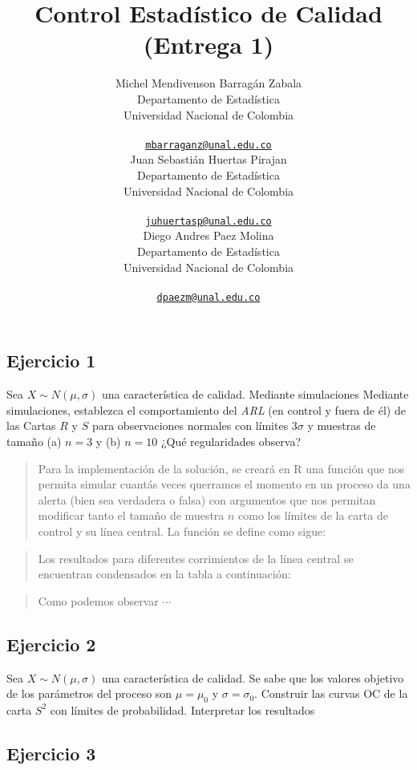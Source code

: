 \documentclass{article}
\title{Control Estadístico de Calidad (Entrega 1)}
\author{
    Michel Mendivenson Barragán Zabala
   \\
    Departamento de Estadística \\
    Universidad Nacional de Colombia \\
   \\
  \texttt{\href{mailto:mbarraganz@unal.edu.co}{\nolinkurl{mbarraganz@unal.edu.co}}} \\
   \And
    Juan Sebastián Huertas Pirajan
   \\
    Departamento de Estadística \\
    Universidad Nacional de Colombia \\
   \\
  \texttt{\href{mailto:juhuertasp@unal.edu.co}{\nolinkurl{juhuertasp@unal.edu.co}}} \\
   \And
    Diego Andres Paez Molina
   \\
    Departamento de Estadística \\
    Universidad Nacional de Colombia \\
   \\
  \texttt{\href{mailto:dpaezm@unal.edu.co}{\nolinkurl{dpaezm@unal.edu.co}}} \\
  }
\renewenvironment{abstract}{}{}
\begin{document}
\maketitle


\begin{abstract}

\end{abstract}


\hypertarget{ejercicio-1}{%
\subsection{Ejercicio 1}\label{ejercicio-1}}

Sea \(X \sim N(\mu, \sigma)\) una característica de calidad. Mediante
simulaciones Mediante simulaciones, establezca el comportamiento del
\emph{ARL} (en control y fuera de él) de las Cartas \(R\) y \(S\) para
observaciones normales con límites \(3\sigma\) y muestras de tamaño (a)
\(n = 3\) y (b) \(n = 10\) ¿Qué regularidades observa?

\begin{quote}
Para la implementación de la solución, se creará en R una función que
nos permita simular cuantás veces querramos el momento en un proceso da
una alerta (bien sea verdadera o falsa) con argumentos que nos permitan
modificar tanto el tamaño de muestra \(n\) como los límites de la carta
de control y su línea central. La función se define como sigue:
\end{quote}

\begin{quote}
Los resultados para diferentes corrimientos de la línea central se
encuentran condensados en la tabla a continuación:
\end{quote}

\begin{quote}
Como podemos observar \(\cdots\)
\end{quote}

\hypertarget{ejercicio-2}{%
\subsection{Ejercicio 2}\label{ejercicio-2}}

Sea \(X \sim N(\mu, \sigma)\) una característica de calidad. Se sabe que
los valores objetivo de los parámetros del proceso son \(\mu = \mu_0\) y
\(\sigma = \sigma_0\). Construir las curvas OC de la carta \(S^2\) con
límites de probabilidad. Interpretar los resultados

\hypertarget{ejercicio-3}{%
\subsection{Ejercicio 3}\label{ejercicio-3}}
\end{document}

